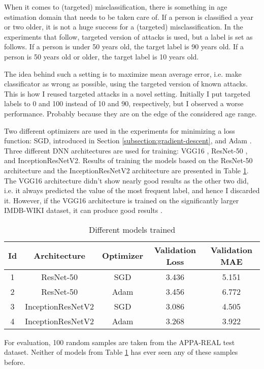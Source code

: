 When it comes to (targeted) misclassification, there is something in age estimation domain that needs to be taken care of. If a person is classified a year or two older, it is not a huge success for a (targeted) misclassification. In the experiments that follow, targeted version of attacks is used, but a label is set as follows. If a person is under 50 years old, the target label is 90 years old. If a person is 50 years old or older, the target label is 10 years old. 

The idea behind such a setting is to maximize mean average error, i.e. make classificator as wrong as possible, using the targeted version of known attacks.  This is how I reused targeted attacks in a novel setting. Initially I put targeted labels to 0 and 100 instead of 10 and 90, respectively, but I observed a worse performance. Probably because they are on the edge of the considered age range.

Two different optimizers are used in the experiments for minimizing a loss function: SGD, introduced in Section \ref{subsection:gradient-descent}, and Adam \cite{DBLP:journals/corr/KingmaB14}. Three different DNN architectures are used for training: VGG16 \cite{DBLP:journals/corr/SimonyanZ14a}, ResNet-50 \cite{DBLP:journals/corr/HeZRS15}, and InceptionResNetV2\cite{DBLP:journals/corr/SzegedyIV16}. Results of training the models based on the ResNet-50 architecture and the InceptionResNetV2 architecture are presented in Table \ref{table:trained-models}. The VGG16 architecture didn't show nearly good results as the other two did, i.e. it always predicted the value of the most frequent label, and hence I discarded it. However, if the VGG16 architecture is trained on the significantly larger IMDB-WIKI dataset, it can produce good results \cite{Rothe-IJCV-2016}. 

\begin{table}[]
\centering
\begin{tabular}{|c|c|c|c|c|}
\hline
Id & Architecture & Optimizer & Validation Loss & \textbf{Validation MAE} \\ \hline
1 & ResNet-50 & SGD & 3.436 & 5.151 \\ \hline
2 & ResNet-50 & Adam & 3.456 & 6.772 \\ \hline
3 & InceptionResNetV2 & SGD & 3.086 & 4.505  \\ \hline
4 & InceptionResNetV2 & Adam & 3.268 & 3.922 \\ \hline
\end{tabular}
\caption{Different models trained}
\label{table:trained-models}
\end{table}

For evaluation, 100 random samples are taken from the APPA-REAL test dataset. Neither of models from Table \ref{table:trained-models} has ever seen any of these samples before.

